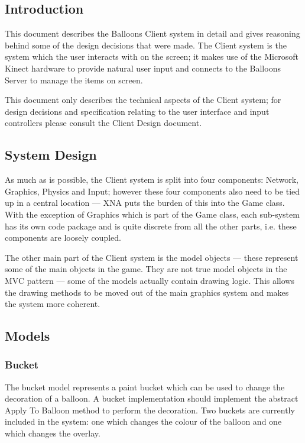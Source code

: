 \subsection{Introduction}
This document describes the Balloons Client system in detail and gives 
reasoning behind some of the design decisions that were made. The Client system
is the system which the user interacts with on the screen; it makes use of the
Microsoft Kinect hardware to provide natural user input and connects to the 
Balloons Server to manage the items on screen. 

This document only describes the technical aspects of the Client system; for 
design decisions and specification relating to the user interface and input 
controllers please consult the Client Design document.

\subsection{System Design}
As much as is possible, the Client system is split into four components: 
Network, Graphics, Physics and Input; however these four components also need 
to be tied up in a central location --- XNA puts the burden of this into the Game
class. With the exception of Graphics which is part of the Game class, each
sub-system has its own code package and is quite discrete from all the other 
parts, i.e. these components are loosely coupled.

The other main part of the Client system is the model objects --- these represent
some of the main objects in the game. They are not true model objects in the
MVC pattern --- some of the models actually contain drawing logic. This allows
the drawing methods to be moved out of the main graphics system and makes the
system more coherent.

\subsection{Models}
\subsubsection{Bucket}
The bucket model represents a paint bucket which can be used to change the 
decoration of a balloon. A bucket implementation should implement the abstract
Apply To Balloon method to perform the decoration. Two buckets are currently
included in the system: one which changes the colour of the balloon and one 
which changes the overlay. 

